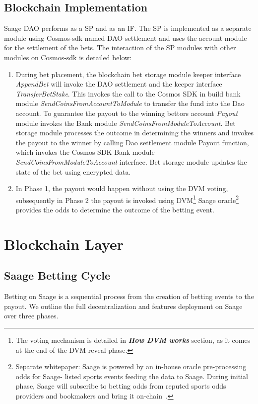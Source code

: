 \documentclass[%
 aapm,
 mph,%
 amsmath,amssymb,
 reprint,%
]{revtex4-2}
\begin{document}
\subsection{Blockchain Implementation} 
Saage DAO performs as a SP and as an IF. The SP is implemented as a separate module using Cosmos-sdk named DAO settlement and uses the account module for the settlement of the bets. The interaction of the SP modules with other modules on Cosmos-sdk is detailed below: 

\begin{enumerate}

\item During bet placement, the blockchain bet storage module keeper interface \textit{AppendBet} will invoke the DAO settlement and the keeper interface \textit{TransferBetStake}. This invokes the call to the Cosmos SDK in build bank module \textit{SendCoinsFromAccountToModule} to transfer the fund into the Dao account. To guarantee the payout to the winning bettors account \textit{Payout} module invokes the Bank module \textit{SendCoinsFromModuleToAccount}. Bet storage module processes the outcome in determining the winners and invokes the payout to the winner by calling Dao settlement module Payout function, which invokes the Cosmos SDK Bank module \textit{SendCoinsFromModuleToAccount} interface. Bet storage module updates the state of the bet using encrypted data. 
\item In Phase 1, the payout would happen without using the DVM voting, subsequently in Phase 2 the payout is invoked using DVM\footnote{The voting mechanism is detailed in \textbf{\textit{How DVM works}} section, as it comes at the end of the DVM reveal phase.} 
Saage oracle\footnote{Separate whitepaper: Saage is powered by an in-house oracle pre-processing odds for Saage- listed sports events feeding the data to Saage. During initial phase, Saage will subscribe to betting odds from reputed sports odds providers and bookmakers and bring it on-chain~\cite{Oracle}.} provides the odds to determine the outcome of the betting event. 
\end{enumerate}


\section{Blockchain Layer}\label{Section4}

\subsection{Saage Betting Cycle} 
Betting on Saage is a sequential process from the creation of betting events to the payout. We outline the full decentralization and features deployment on Saage over three phases.
\end{document}
